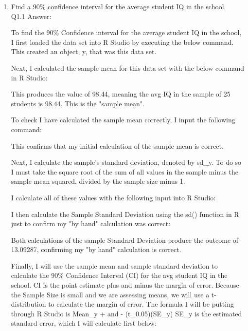 \documentclass[12pt,letterpaper]{article}
\begin{document}
	\begin{enumerate}
		\item Find a 90\% confidence interval for the average student IQ in the school.\\
		
		Q1.1 Answer:
		
		To find the 90\% Confidence interval for the average student IQ in the school, I first loaded the data set into R Studio by executing the below command. This created an object, y, that was this data set.
		
			
		
		Next, I calculated the sample mean for this data set with the below command in R Studio:
		
		
		
		This produces the value of 98.44, meaning the avg IQ in the sample of 25 students is 98.44. This is the "sample mean".
		
		To check I have calculated the sample mean correctly, I input the following command:
		
		
		
		This confirms that my initial calculation of the sample mean is correct.
		
		Next, I calculate the sample's standard deviation, denoted by sd\_y. To do so I must take the square root of the sum of all values in the sample minus the sample mean squared, divided by the sample size minus 1.
		
		I calculate all of these values with the following input into R Studio:
		
		
		
		I then calculate the Sample Standard Deviation using the sd() function in R just to confirm my "by hand" calculation was correct:
		
		
		
		Both calculations of the sample Standard Deviation produce the outcome of 13.09287, confirming my "by hand" calculation is correct.
		
		Finally, I will use the sample mean and sample standard deviation to calculate the 90\% Confidence Interval (CI) for the avg student IQ in the school.
		CI is the point estimate plus and minus the margin of error.
		Because the Sample Size is small and we are assessing means, we will use a t-distribution to calculate the margin of error.
		The formula I will be putting through R Studio is Mean\_y + and - (t\_0.05)(SE\_y)
		SE\_y is the estimated standard error, which I will calculate first below:
		

\end{enumerate}
\end{document}
